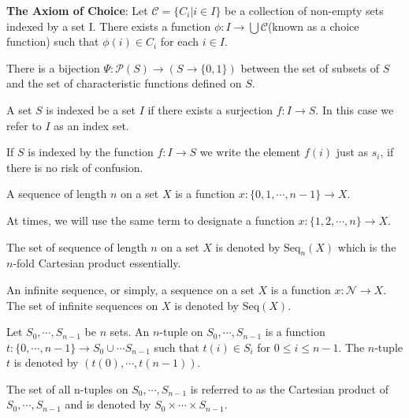 \documentclass[../main.tex]{subfiles}
\begin{document}
\begin{green}
\textbf{The Axiom of Choice}: Let $\mathcal{C}=\{C_i|i\in I\}$ be a collection of non-empty sets indexed by a set I. There exists a function $\phi: I\rightarrow\bigcup\mathcal{C}$(known as a choice function) such that $\phi(i)\in C_i$ for each $i\in I$.
\end{green}

\begin{yellow}
\begin{theorem}
There is a bijection $\Psi:\mathcal{P}(S)\rightarrow(S\rightarrow\{0,1\})$ between the set of subsets of $S$ and the set of characteristic functions defined on $S$.
\end{theorem}
\end{yellow}

\begin{purple}
\begin{definition}
A set $S$ is indexed be a set $I$ if there exists a surjection $f:I\rightarrow S$. In this case we refer to $I$ as an index set.

If $S$ is indexed by the function $f: I\rightarrow S$ we write the element $f(i)$ just as $s_i$, if there is no risk of confusion.
\end{definition}
\end{purple}

\begin{purple}
\begin{definition}
A sequence of length $n$ on a set $X$ is a function $x:\{0,1,\cdots,n-1\}\rightarrow X$.

At times, we will use the same term to designate a function $x:\{1,2,\cdots,n\}\rightarrow X$.

The set of sequence of length $n$ on a set $X$ is denoted by $\text{Seq}_n(X)$ which is the $n$-fold Cartesian product essentially.

An infinite sequence, or simply, a sequence on a set $X$ is a function $x:\mathcal{N}\rightarrow X$. The set of infinite sequences on $X$ is denoted by $\text{Seq}(X)$.

Let $S_0,\cdots,S_{n-1}$ be $n$ sets. An $n$-tuple on $S_0,\cdots, S_{n-1}$ is a function $t:\{0,\cdots,n-1\}\rightarrow S_0\cup\cdots S_{n-1}$ such that $t(i)\in S_i$ for $0\le i\le n-1$. The $n$-tuple $t$ is denoted by $(t(0),\cdots,t(n-1))$.

The set of all n-tuples on $S_0,\cdots,S_{n-1}$ is referred to as the Cartesian product of $S_0,\cdots, S_{n-1}$ and is denoted by $S_0\times \cdots\times S_{n-1}$.
\end{definition}
\end{purple}
\end{document}
